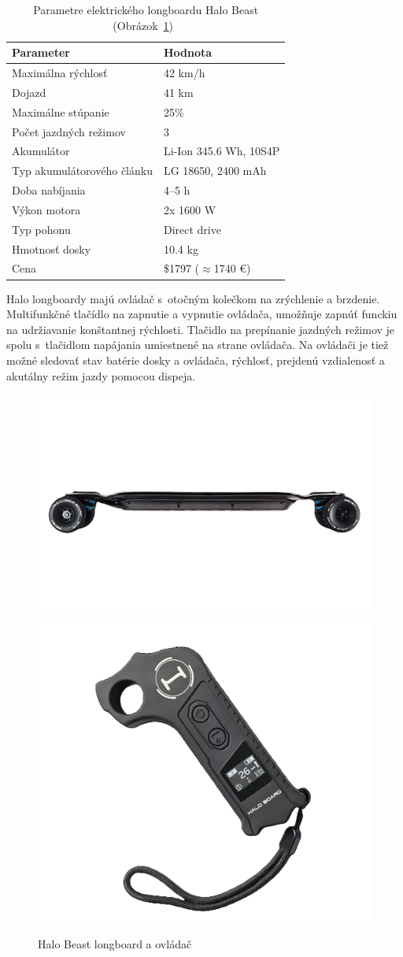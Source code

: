 \begin{table}[h]
    \centering
    \begin{tabular}{|l|l|}
        \hline
        \textbf{Parameter} & \textbf{Hodnota} \\ \hline
        Maximálna rýchlosť & 42 km/h \\ \hline
        Dojazd & 41 km \\ \hline
        Maximálne stúpanie & 25\% \\ \hline
        Počet jazdných režimov & 3 \\ \hline
        Akumulátor & Li-Ion 345.6 Wh, 10S4P \\ \hline
        Typ akumulátorového článku & LG 18650, 2400 mAh \\ \hline
        Doba nabíjania & 4--5 h \\ \hline
        Výkon motora & 2x 1600 W \\ \hline
        Typ pohonu & Direct drive \\ \hline
        Hmotnosť dosky & 10.4 kg \\ \hline
        Cena & \$1797 ($\approx$1740 €) \\ \hline
    \end{tabular}
    \caption{Parametre elektrického longboardu Halo Beast (Obrázok~\ref{fig:halo})~\cite{Halo}}\label{tab:halo}
\end{table}

Halo longboardy majú ovládač s~otočným kolečkom na zrýchlenie a brzdenie.
Multifunkčné tlačídlo na zapnutie a vypnutie ovládača, umožňuje zapnúť funckiu na udržiavanie konštantnej rýchlosti.
Tlačidlo na prepínanie jazdných režimov je spolu s~tlačidlom napájania umiestnené na strane ovládača.
Na ovládači je tiež možné sledovať stav batérie dosky a ovládača, rýchlosť, prejdenú vzdialenosť a akutálny režim jazdy pomocou dispeja.

\begin{figure}[h]
    \centering
    \includegraphics[width=0.48\linewidth]{obrazky-figures/brand-reviews/halo-longboard.png}\hfill
    \includegraphics[width=0.48\linewidth]{obrazky-figures/brand-reviews/halo-controller.png}
    \caption{Halo Beast longboard a ovládač\cite{Halo}}\label{fig:halo}
\end{figure}

